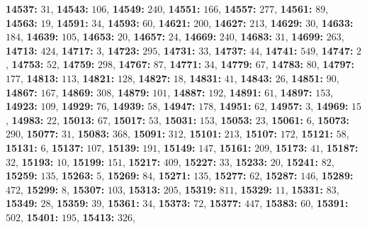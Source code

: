 \textsf{\bfseries 14537:} $31$, \textsf{\bfseries 14543:} $106$, \textsf{\bfseries 14549:} $240$, \textsf{\bfseries 14551:} $166$, \textsf{\bfseries 14557:} $277$, \textsf{\bfseries 14561:} $89$, \textsf{\bfseries 14563:} $19$, \textsf{\bfseries 14591:} $34$, \textsf{\bfseries 14593:} $60$, \textsf{\bfseries 14621:} $200$, \textsf{\bfseries 14627:} $213$, \textsf{\bfseries 14629:} $30$, \textsf{\bfseries 14633:} $184$, \textsf{\bfseries 14639:} $105$, \textsf{\bfseries 14653:} $20$, \textsf{\bfseries 14657:} $24$, \textsf{\bfseries 14669:} $240$, \textsf{\bfseries 14683:} $31$, \textsf{\bfseries 14699:} $263$, \textsf{\bfseries 14713:} $424$, \textsf{\bfseries 14717:} $3$, \textsf{\bfseries 14723:} $295$, \textsf{\bfseries 14731:} $33$, \textsf{\bfseries 14737:} $44$, \textsf{\bfseries 14741:} $549$, \textsf{\bfseries 14747:} $2$, \textsf{\bfseries 14753:} $52$, \textsf{\bfseries 14759:} $298$, \textsf{\bfseries 14767:} $87$, \textsf{\bfseries 14771:} $34$, \textsf{\bfseries 14779:} $67$, \textsf{\bfseries 14783:} $80$, \textsf{\bfseries 14797:} $177$, \textsf{\bfseries 14813:} $113$, \textsf{\bfseries 14821:} $128$, \textsf{\bfseries 14827:} $18$, \textsf{\bfseries 14831:} $41$, \textsf{\bfseries 14843:} $26$, \textsf{\bfseries 14851:} $90$, \textsf{\bfseries 14867:} $167$, \textsf{\bfseries 14869:} $308$, \textsf{\bfseries 14879:} $101$, \textsf{\bfseries 14887:} $192$, \textsf{\bfseries 14891:} $61$, \textsf{\bfseries 14897:} $153$, \textsf{\bfseries 14923:} $109$, \textsf{\bfseries 14929:} $76$, \textsf{\bfseries 14939:} $58$, \textsf{\bfseries 14947:} $178$, \textsf{\bfseries 14951:} $62$, \textsf{\bfseries 14957:} $3$, \textsf{\bfseries 14969:} $15$, \textsf{\bfseries 14983:} $22$, \textsf{\bfseries 15013:} $67$, \textsf{\bfseries 15017:} $53$, \textsf{\bfseries 15031:} $153$, \textsf{\bfseries 15053:} $23$, \textsf{\bfseries 15061:} $6$, \textsf{\bfseries 15073:} $290$, \textsf{\bfseries 15077:} $31$, \textsf{\bfseries 15083:} $368$, \textsf{\bfseries 15091:} $312$, \textsf{\bfseries 15101:} $213$, \textsf{\bfseries 15107:} $172$, \textsf{\bfseries 15121:} $58$, \textsf{\bfseries 15131:} $6$, \textsf{\bfseries 15137:} $107$, \textsf{\bfseries 15139:} $191$, \textsf{\bfseries 15149:} $147$, \textsf{\bfseries 15161:} $209$, \textsf{\bfseries 15173:} $41$, \textsf{\bfseries 15187:} $32$, \textsf{\bfseries 15193:} $10$, \textsf{\bfseries 15199:} $151$, \textsf{\bfseries 15217:} $409$, \textsf{\bfseries 15227:} $33$, \textsf{\bfseries 15233:} $20$, \textsf{\bfseries 15241:} $82$, \textsf{\bfseries 15259:} $135$, \textsf{\bfseries 15263:} $5$, \textsf{\bfseries 15269:} $84$, \textsf{\bfseries 15271:} $135$, \textsf{\bfseries 15277:} $62$, \textsf{\bfseries 15287:} $146$, \textsf{\bfseries 15289:} $472$, \textsf{\bfseries 15299:} $8$, \textsf{\bfseries 15307:} $103$, \textsf{\bfseries 15313:} $205$, \textsf{\bfseries 15319:} $811$, \textsf{\bfseries 15329:} $11$, \textsf{\bfseries 15331:} $83$, \textsf{\bfseries 15349:} $28$, \textsf{\bfseries 15359:} $39$, \textsf{\bfseries 15361:} $34$, \textsf{\bfseries 15373:} $72$, \textsf{\bfseries 15377:} $447$, \textsf{\bfseries 15383:} $60$, \textsf{\bfseries 15391:} $502$, \textsf{\bfseries 15401:} $195$, \textsf{\bfseries 15413:} $326$, 
